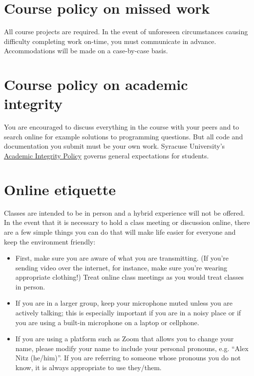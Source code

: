 \documentclass[12pt]{article}
\begin{document}
\clearpage


\section*{Course policy on missed work}

All course projects are required. In the event of unforeseen circumstances causing difficulty completing work on-time, you must communicate in advance. Accommodations will be made on a case-by-case basis.

\section*{Course policy on academic integrity}

You are encouraged to discuss everything in the course with your peers and to search online for example solutions to programming questions. But all code and documentation you submit must be your own work. Syracuse University’s \href{https://class.syr.edu/academic-integrity/policy/}{Academic Integrity Policy} governs general expectations for students.

\section*{Online etiquette}

Classes are intended to be in person and a hybrid experience will not be offered. In the event that it is necessary
to hold a class meeting or discussion online, there are a few simple things you can do that will make life easier for everyone and keep the environment friendly:
\begin{itemize}
\item First, make sure you are aware of what you are transmitting. (If you’re sending video over the internet, for instance, make sure you’re wearing appropriate clothing!) Treat online class meetings as you would treat classes in person.
\item If you are in a larger group, keep your microphone muted unless you are actively talking; this is especially important if you are in a noisy place or if you are using a built-in microphone on a laptop or cellphone.
\item If you are using a platform such as Zoom that allows you to change your name, please modify your name to include your personal pronouns, e.g. “Alex Nitz (he/him)”. If you are referring to someone whose pronouns you do not know, it is always appropriate to use they/them.
\end{itemize}
\end{document}
